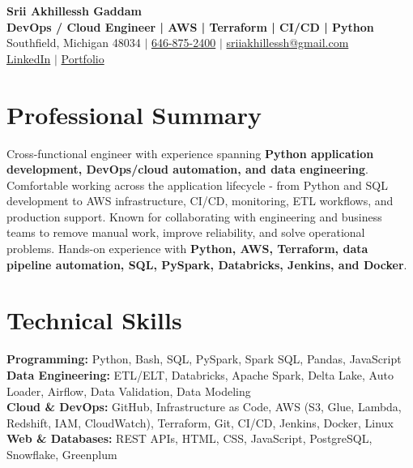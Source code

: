 \documentclass[letterpaper,10pt]{article}
\begin{document}
\fontsize{9.35pt}{10.45pt}\selectfont

\begin{center}
    {\LARGE \textbf{Srii Akhillessh Gaddam}} \\[-1pt]
    \textbf{DevOps / Cloud Engineer | AWS | Terraform | CI/CD | Python} \\[2pt]
    Southfield, Michigan 48034 $|$
    \href{tel:6468752400}{646-875-2400} $|$
    \href{mailto:sriiakhillessh@gmail.com}{sriiakhillessh@gmail.com} \\[1pt]
    \href{https://www.linkedin.com/in/srii-akhiilessh-gaddam-b48668191/}{LinkedIn} $|$
    \href{https://sriiakhillesshg.github.io/portfolio/}{Portfolio}
\end{center}
\vspace{-8pt}

\section{Professional Summary}
\small{Cross-functional engineer with experience spanning \textbf{Python application development, DevOps/cloud automation, and data engineering}. Comfortable working across the application lifecycle - from Python and SQL development to AWS infrastructure, CI/CD, monitoring, ETL workflows, and production support. Known for collaborating with engineering and business teams to remove manual work, improve reliability, and solve operational problems. Hands-on experience with \textbf{Python, AWS, Terraform, data pipeline automation, SQL, PySpark, Databricks, Jenkins, and Docker}.}

\section{Technical Skills}
\small{
\textbf{Programming:} Python, Bash, SQL, PySpark, Spark SQL, Pandas, JavaScript \\
\textbf{Data Engineering:} ETL/ELT, Databricks, Apache Spark, Delta Lake, Auto Loader, Airflow, Data Validation, Data Modeling \\
\textbf{Cloud \& DevOps:} GitHub, Infrastructure as Code, AWS (S3, Glue, Lambda, Redshift, IAM, CloudWatch), Terraform, Git, CI/CD, Jenkins, Docker, Linux \\
\textbf{Web \& Databases:} REST APIs, HTML, CSS, JavaScript, PostgreSQL, Snowflake, Greenplum
}
\end{document}
